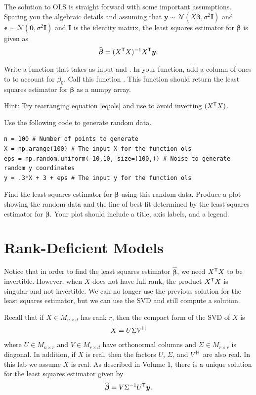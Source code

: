 The solution to OLS is straight forward with some important assumptions. Sparing you the algebraic details and assuming that 
$\boldsymbol y \sim \mathcal{N}(X\boldsymbol\beta, \sigma^2 \boldsymbol I)$ and $\boldsymbol\epsilon \sim \mathcal{N}(\boldsymbol 0, \sigma^2 \boldsymbol I)$ and $\boldsymbol I$ is the identity matrix, 
the least squares estimator for $\boldsymbol\beta$ is given as 
\begin{equation}
\widehat{\boldsymbol\beta} = (X^{\mathsf T} X)^{-1} X^{\mathsf T}  \boldsymbol y .
\label{eq:ols}
\end{equation}

\begin{problem}
Write a function that takes as input  and . 
In your function, add a column of ones to  to account for $\beta_0$.
Call this function . 
This function should return the least squares estimator for $\boldsymbol\beta$ as a numpy array.

Hint: Try rearranging equation \eqref{eq:ols} and use  to avoid inverting $(X^{\mathsf T}  X)$.
\end{problem}

\begin{problem}
Use the following code to generate random data.
\begin{lstlisting}
n = 100 # Number of points to generate
X = np.arange(100) # The input X for the function ols
eps = np.random.uniform(-10,10, size=(100,)) # Noise to generate random y coordinates
y = .3*X + 3 + eps # The input y for the function ols
\end{lstlisting} 
Find the least squares estimator for $\boldsymbol\beta$ using this random data. 
Produce a plot showing the random data and the line of best fit determined by the least squares estimator for $\boldsymbol\beta$. 
Your plot should include a title, axis labels, and a legend. 
\end{problem}

\section*{Rank-Deficient Models}
Notice that in order to find the least squares estimator $\widehat{\boldsymbol\beta}$, we need $X^{\mathsf T} X$ to be invertible. 
However, when $X$ does not have full rank, the product $X^{\mathsf T} X$ is singular and not invertible. 
We can no longer use the previous solution for the least squares estimator, but we can use the SVD and still compute a solution. 

Recall that if $X \in M_{n\times d}$ has rank $r$, then the compact form of the SVD of $X$ is \[ X = U\Sigma V^{\mathsf H}  \]
where $U \in M_{n\times r}$ and $V \in M_{r\times d}$ have orthonormal columns and $\Sigma \in M_{r\times r}$ is diagonal. 
In addition, if $X$ is real, then the factors $U$, $\Sigma$, and $V^{\mathsf H} $ are also real. In this lab we assume $X$ is real. 
As described in Volume 1, there is a unique solution for the least squares estimator given by 
\begin{equation}
\widehat{\boldsymbol\beta} = V \Sigma^{-1}U^{\mathsf T} \boldsymbol y. 
\end{equation}

